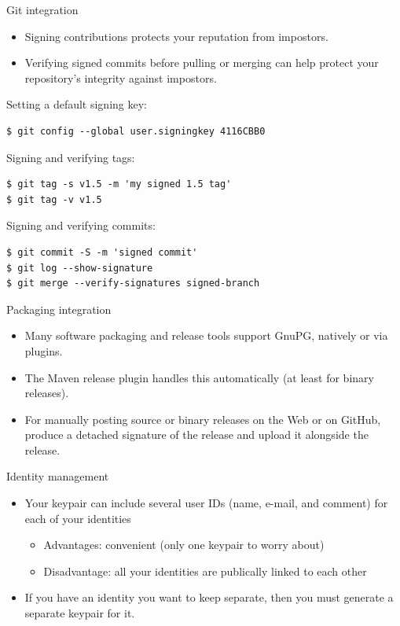 \documentclass[
mode=present,
paper=smartboard,
size=20pt,
]{powerdot}
\newcommand\vsp{\vspace{-16mm}}
\begin{document}
\makeatletter\renewcommand{\verbatim@font}{\footnotesize\tt}\makeatother
\begin{slide}[method=direct]{Git integration}
  \begin{itemize}
  \item Signing contributions protects your reputation from impostors.
  \item Verifying signed commits before pulling or merging can help
    protect your repository's integrity against impostors.
  \end{itemize}

Setting a default signing key:

\vsp
\begin{verbatim}
$ git config --global user.signingkey 4116CBB0
\end{verbatim}

Signing and verifying tags:

\vsp
\begin{verbatim}
$ git tag -s v1.5 -m 'my signed 1.5 tag'
$ git tag -v v1.5
\end{verbatim}

Signing and verifying commits:

\vsp
\begin{verbatim}
$ git commit -S -m 'signed commit'
$ git log --show-signature
$ git merge --verify-signatures signed-branch
\end{verbatim}
\end{slide}

\begin{slide}{Packaging integration}
  \begin{itemize}
  \item Many software packaging and release tools support GnuPG,
    natively or via plugins.
  \item The Maven release plugin handles this automatically (at least
    for binary releases).
  \item For manually posting source or binary releases on the Web or
    on GitHub, produce a detached signature of the release and upload
    it alongside the release.
  \end{itemize}
\end{slide}

\begin{slide}{Identity management}
  \begin{itemize}
  \item Your keypair can include several user IDs (name, e-mail, and
    comment) for each of your identities
    \begin{itemize}
    \item Advantages: convenient (only one keypair to worry about)
    \item Disadvantage: all your identities are publically linked to
      each other
    \end{itemize}
  \item If you have an identity you want to keep separate, then you
    must generate a separate keypair for it.
  \end{itemize}
\end{slide}
\end{document}
